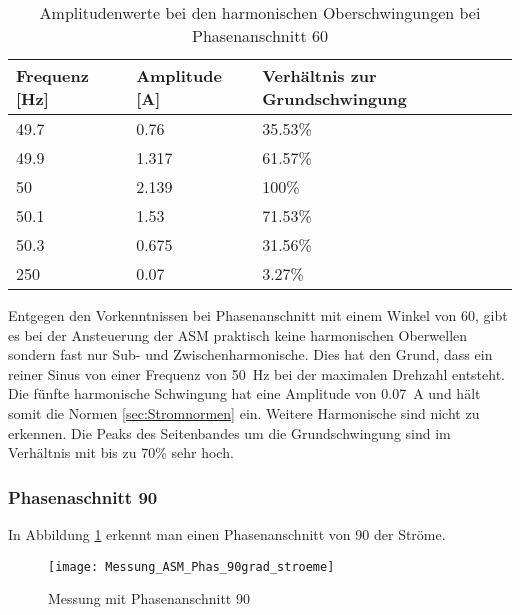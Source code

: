 \begin{table}[ht!]
	\centering
	\begin{tabular}{|l|l|l|}
		\hline
		Frequenz {[}Hz{]} & Amplitude {[}A{]} & Verhältnis zur Grundschwingung	\\ \hline
		49.7              & 0.76              & 35.53\%							\\ \hline
		49.9              & 1.317             & 61.57\%							\\ \hline
		50                & 2.139             & 100\%							\\ \hline
		50.1              & 1.53              & 71.53\%							\\ \hline
		50.3              & 0.675             & 31.56\%							\\ \hline
		250               & 0.07              & 3.27\%							\\ \hline
	\end{tabular}
	\caption{Amplitudenwerte bei den harmonischen Oberschwingungen bei Phasenanschnitt 60\textdegree}\label{tab:Phas_60_ASM_stroeme}
\end{table}
Entgegen den Vorkenntnissen bei Phasenanschnitt mit einem Winkel von 60\textdegree, gibt es bei der Ansteuerung der ASM praktisch keine harmonischen Oberwellen sondern fast nur Sub- und Zwischenharmonische. Dies hat den Grund, dass ein reiner Sinus von einer Frequenz von \SI{50}{Hz} bei der maximalen Drehzahl entsteht. Die fünfte harmonische Schwingung hat eine Amplitude von \SI{0.07}{A} und hält somit die Normen \ref{sec:Stromnormen} ein. Weitere Harmonische sind nicht zu erkennen. Die Peaks des Seitenbandes um die Grundschwingung sind im Verhältnis mit bis zu 70\% sehr hoch.


\subsubsection*{Phasenaschnitt 90\textdegree}

In Abbildung \ref{fig:Mess_Phas_90grad_stroeme} erkennt man einen Phasenanschnitt von 90\textdegree \hspace{0.02cm} der Ströme.

\begin{figure}[ht!]
	\centering
	\texttt{[image: Messung\_ASM\_Phas\_90grad\_stroeme]}	
	\caption{Messung mit Phasenanschnitt 90\textdegree}\label{fig:Mess_Phas_90grad_stroeme}
\end{figure}


